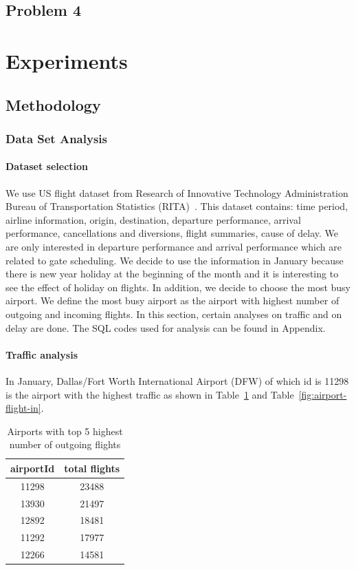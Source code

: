 \documentclass[11pt,a4paper]{article}
\begin{document}
\subsection{Problem 4}
\label{subsec:algo-prob4}

\section{Experiments}
\label{sec:expe}

\subsection{Methodology}
\label{subsec:expo-meth}
\subsubsection{Data Set Analysis}
\label{subsec:expo-data}
\paragraph{Dataset selection}
We use US flight dataset from Research of Innovative Technology Administration Bureau of Transportation Statistics (RITA)~\cite{rita}. This dataset contains: time period, airline information, origin, destination, departure performance, arrival performance, cancellations and diversions, flight summaries, cause of delay. We are only interested in departure performance and arrival performance which are related to gate scheduling. We decide to use the information in January because there is new year holiday at the beginning of the month and it is interesting to see the effect of holiday on flights. In addition, we decide to choose the most busy airport. We define the most busy airport as the airport with highest number of outgoing and incoming flights. In this section, certain analyses on traffic and on delay are done. The SQL codes used for analysis can be found in Appendix.

\paragraph{Traffic analysis}
In January, Dallas/Fort Worth International Airport (DFW) of which id is 11298 is the airport with the highest traffic as shown in Table~\ref{fig:airport-flight-out} and Table~\ref{fig:airport-flight-in}.\par

\begin{table}
\caption{Airports with top 5 highest number of outgoing flights}
\centering
\begin{tabular}{| c | c |}
\hline
airportId & total flights \\
\hline
11298&23488 \\
13930&21497 \\
12892&18481 \\
11292&17977 \\
12266&14581 \\
\hline
\end{tabular}
\label{fig:airport-flight-out}
\end{table}
\end{document}

